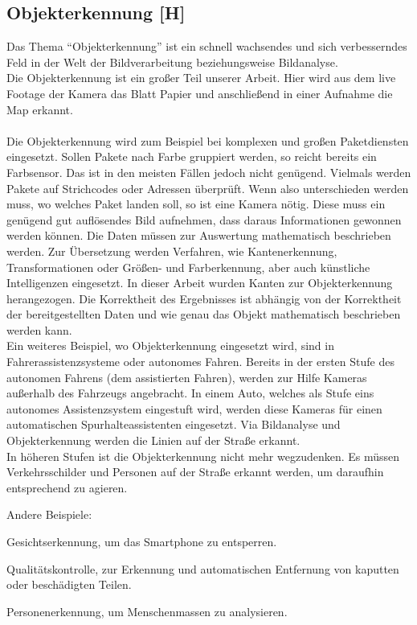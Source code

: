 \subsection{Objekterkennung [H]}
Das Thema ``Objekterkennung'' ist ein schnell wachsendes und sich verbesserndes Feld in der Welt der Bildverarbeitung beziehungsweise
Bildanalyse. \\
Die Objekterkennung ist ein großer Teil unserer Arbeit. Hier wird aus dem live Footage der Kamera das Blatt Papier und anschließend
in einer Aufnahme die Map erkannt.
\\
\\
Die Objekterkennung wird zum Beispiel bei komplexen und großen Paketdiensten eingesetzt. Sollen Pakete nach Farbe gruppiert werden, so
reicht bereits ein Farbsensor. Das ist in den meisten Fällen jedoch nicht genügend.
Vielmals werden Pakete auf Strichcodes oder Adressen überprüft.
Wenn also unterschieden werden muss, wo welches Paket landen soll, so ist eine Kamera nötig. Diese muss
ein genügend gut auflösendes Bild aufnehmen, dass daraus Informationen gewonnen werden können. Die Daten müssen zur Auswertung
mathematisch beschrieben werden. Zur Übersetzung werden Verfahren, wie Kantenerkennung, Transformationen oder Größen- und Farberkennung,
aber auch künstliche Intelligenzen
eingesetzt. In dieser Arbeit wurden Kanten zur Objekterkennung herangezogen.
Die Korrektheit des Ergebnisses ist abhängig von der Korrektheit der bereitgestellten Daten und wie genau das Objekt mathematisch
beschrieben werden kann.
\\
Ein weiteres Beispiel, wo Objekterkennung eingesetzt wird, sind in
Fahrerassistenzsysteme oder autonomes Fahren. Bereits in der ersten Stufe des autonomen Fahrens (dem assistierten Fahren),
werden zur Hilfe Kameras außerhalb des Fahrzeugs angebracht. In einem Auto, welches als Stufe eins autonomes Assistenzsystem
eingestuft wird, werden diese Kameras für einen automatischen Spurhalteassistenten eingesetzt. Via Bildanalyse und Objekterkennung
werden die Linien auf der Straße erkannt. \\
In höheren Stufen ist die Objekterkennung nicht mehr wegzudenken. Es müssen Verkehrsschilder und Personen auf der Straße erkannt
werden, um daraufhin entsprechend zu agieren. \cite{selfdriving}

Andere Beispiele:
\begin{compactitem}
    \item Gesichtserkennung, um das Smartphone zu entsperren.
    \item Qualitätskontrolle, zur Erkennung und automatischen Entfernung von kaputten oder beschädigten Teilen.
    \item Personenerkennung, um Menschenmassen zu analysieren.
\end{compactitem}

